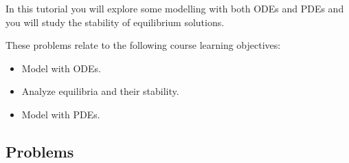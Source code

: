 		\begin{objectives}
			In this tutorial you will explore some modelling with both ODEs and PDEs and you will study the stability of equilibrium solutions.
			
				These problems relate to the following course learning objectives:
				\begin{itemize}\it 
					\item Model with ODEs. \\[-20pt]
					\item Analyze equilibria and their stability. \\[-20pt]
					\item Model with PDEs.
				\end{itemize}
		\end{objectives}



\vspace{-.5em}
\subsection*{Problems}
\vspace{-.5em}


